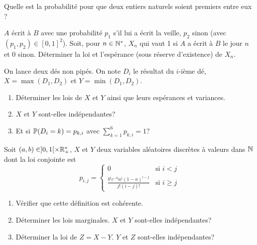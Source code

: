 \documentclass[12pt]{article}
\begin{document}
\begin{exercise}
	Quelle est la probabilité pour que deux entiers naturels soient premiers entre
	eux ?
\end{exercise}

\begin{exercise}
	$A$ écrit à $B$ avec une probabilité $p_{1}$ s'il lui a écrit la veille,
	$p_{2}$ sinon (avec $(p_{1},p_{2})\in[0,1]^{2}$). Soit, pour $n\in\N^{*}$,
	$X_{n}$ qui vaut 1 si $A$ a écrit à $B$ le jour $n$ et 0 sinon. Déterminer la
	loi et l'espérance (sous réserve d'existence) de $X_{n}$.
\end{exercise}

\begin{exercise}
	On lance deux dés non pipés. On note $D_{i}$ le résultat du $i$-ième dé,
	$X=\max(D_{1},D_{2})$ et $Y=\min(D_{1},D_{2})$.
	\begin{enumerate}
		\item
		Déterminer les lois de $X$ et $Y$ ainsi que leurs espérances et variances.
		\item
		$X$ et $Y$ sont-elles indépendantes?
		\item
		Et si $\P(D_{i}=k)=p_{k,i}$ avec $\sum_{k=1}^{6}p_{k,i}=1$?
	\end{enumerate}
\end{exercise}

\begin{exercise}
	Soit $(a,b)\in]0,1[\times\R_{+}^{*}$, $X$ et $Y$ deux variables aléatoires
	discrètes à valeurs dans $\N$ dont la loi conjointe est
	$$
	p_{i,j}=
	\left\{
		\begin{array}{cc}
			0 & \text{si }i<j\\
			\frac{b^{i}e^{-b}a^{j}(1-a)^{i-j}}{j!(i-j)!} & \text{si }i\geqslant j
		\end{array}
	\right.
	$$
	\begin{enumerate}
		\item
		Vérifier que cette définition est cohérente.
		\item
		Déterminer les lois marginales. $X$ et $Y$ sont-elles indépendantes?
		\item
		Déterminer la loi de $Z=X-Y$. $Y$ et $Z$ sont-elles indépendantes?
	\end{enumerate}
\end{exercise}
\end{document}
